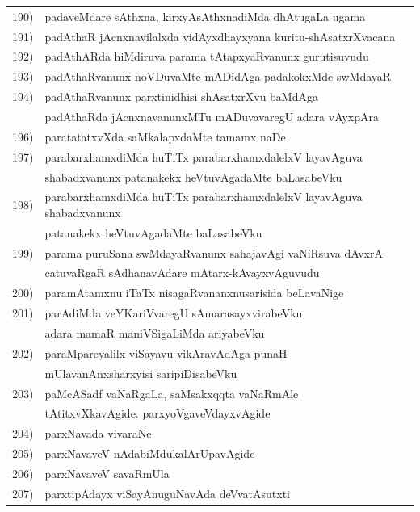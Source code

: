 {\begin{longtable}{@{}cp{7.4cm}r}
190) & padaveMdare sAthxna, kirxyAsAthxnadiMda dhAtugaLa ugama & \pageref{page1}\\
191) & padAthaR jAcnxnavilalxda vidAyxdhayxyana kuritu-shAsatxrXvacana & \pageref{page39}\\
192) & padAthARda hiMdiruva parama tAtapxyaRvanunx gurutisuvudu & \pageref{page240}\\
193) & padAthaRvanunx noVDuvaMte mADidAga padakokxMde swMdayaR & \pageref{page201}\\
194) & padAthaRvanunx parxtinidhisi shAsatxrXvu baMdAga  & \\
     & padAthaRda jAcnxnavanunxMTu mADuvavaregU adara vAyxpAra & \pageref{page198}\\
196) & paratatatxvXda saMkalapxdaMte tamamx naDe &  \pageref{page198}\\
197) & parabarxhamxdiMda huTiTx parabarxhamxdalelxV layavAguva & \\
     & shabadxvanunx patanakekx heVtuvAgadaMte baLasabeVku & \pageref{page192}\\
198) & parabarxhamxdiMda huTiTx parabarxhamxdalelxV layavAguva shabadxvanunx& \\ 
     & patanakekx heVtuvAgadaMte baLasabeVku  & \pageref{page192}\\
199) & parama puruSana swMdayaRvanunx sahajavAgi vaNiRsuva dAvxrA & \\
     & catuvaRgaR sAdhanavAdare mAtarx-kAvayxvAguvudu & \pageref{page193}\\ 
200) & paramAtamxnu iTaTx nisagaRvananxnusarisida beLavaNige & \pageref{page77}\\
201) & parAdiMda veYKariVvaregU sAmarasayxvirabeVku & \\
     & adara mamaR maniVSigaLiMda ariyabeVku & \pageref{page204}  \\
202) & paraMpareyalilx viSayavu vikAravAdAga punaH & \\
     & mUlavanAnxsharxyisi saripiDisabeVku & \pageref{page167}\\
203) & paMcASadf vaNaRgaLa, saMsakxqqta vaNaRmAle & \\
     & tAtitxvXkavAgide. parxyoVgaveVdayxvAgide & \pageref{page185}\\
204) & parxNavada vivaraNe & \pageref{page121}\\
205) & parxNavaveV nAdabiMdukalArUpavAgide & \pageref{page161}\\
206) & parxNavaveV savaRmUla & \pageref{page100}\\
207) & parxtipAdayx viSayAnuguNavAda deVvatAsutxti & \pageref{page128}\\

\end{longtable}}
